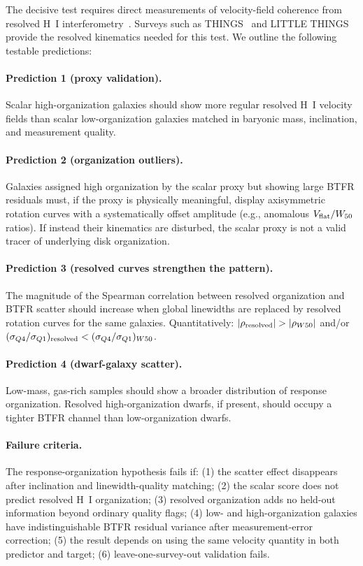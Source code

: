 \documentclass[11pt]{article}
\begin{document}
The decisive test requires direct measurements of velocity-field coherence from resolved H~I interferometry~\cite{verheijen2001, bosma1978}. Surveys such as THINGS~\cite{walter2008} and LITTLE THINGS~\cite{oh2015} provide the resolved kinematics needed for this test. We outline the following testable predictions:

\paragraph{Prediction 1 (proxy validation).} Scalar high-organization galaxies should show more regular resolved H~I velocity fields than scalar low-organization galaxies matched in baryonic mass, inclination, and measurement quality.

\paragraph{Prediction 2 (organization outliers).} Galaxies assigned high organization by the scalar proxy but showing large BTFR residuals must, if the proxy is physically meaningful, display axisymmetric rotation curves with a systematically offset amplitude (e.g., anomalous $V_{\rm flat}/W_{50}$ ratios). If instead their kinematics are disturbed, the scalar proxy is not a valid tracer of underlying disk organization.

\paragraph{Prediction 3 (resolved curves strengthen the pattern).} The magnitude of the Spearman correlation between resolved organization and BTFR scatter should increase when global linewidths are replaced by resolved rotation curves for the same galaxies. Quantitatively: $|\rho_{\rm resolved}| > |\rho_{W50}|$ and/or $(\sigma_{Q4}/\sigma_{Q1})_{\rm resolved} < (\sigma_{Q4}/\sigma_{Q1})_{W50}$.

\paragraph{Prediction 4 (dwarf-galaxy scatter).} Low-mass, gas-rich samples should show a broader distribution of response organization. Resolved high-organization dwarfs, if present, should occupy a tighter BTFR channel than low-organization dwarfs.

\paragraph{Failure criteria.} The response-organization hypothesis fails if: (1) the scatter effect disappears after inclination and linewidth-quality matching; (2) the scalar score does not predict resolved H~I organization; (3) resolved organization adds no held-out information beyond ordinary quality flags; (4) low- and high-organization galaxies have indistinguishable BTFR residual variance after measurement-error correction; (5) the result depends on using the same velocity quantity in both predictor and target; (6) leave-one-survey-out validation fails.
\end{document}
